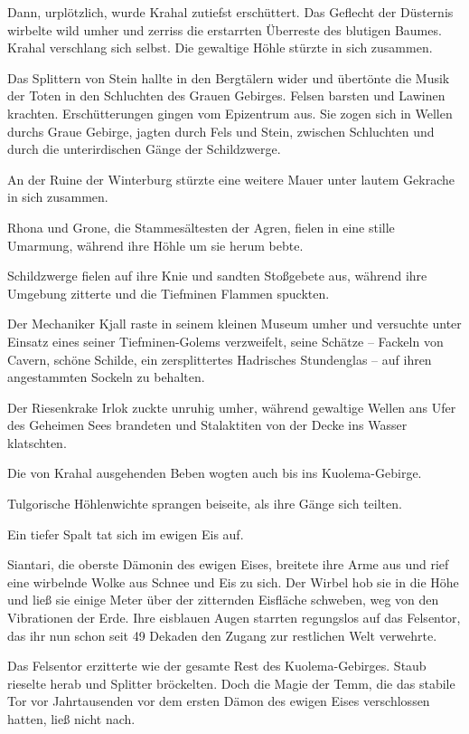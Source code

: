 Dann, urplötzlich, wurde Krahal zutiefst erschüttert. Das Geflecht der Düsternis wirbelte wild umher und zerriss die erstarrten Überreste des blutigen Baumes. Krahal verschlang sich selbst. Die gewaltige Höhle stürzte in sich zusammen.

Das Splittern von Stein hallte in den Bergtälern wider und übertönte die Musik der Toten in den Schluchten des Grauen Gebirges. Felsen barsten und Lawinen krachten. Erschütterungen gingen vom Epizentrum aus. Sie zogen sich in Wellen durchs Graue Gebirge, jagten durch Fels und Stein, zwischen Schluchten und durch die unterirdischen Gänge der Schildzwerge.

An der Ruine der Winterburg stürzte eine weitere Mauer unter lautem Gekrache in sich zusammen.

Rhona und Grone, die Stammesältesten der Agren, fielen in eine stille Umarmung, während ihre Höhle um sie herum bebte.

Schildzwerge fielen auf ihre Knie und sandten Stoßgebete aus, während ihre Umgebung zitterte und die Tiefminen Flammen spuckten.

Der Mechaniker Kjall raste in seinem kleinen Museum umher und versuchte unter Einsatz eines seiner Tiefminen-Golems verzweifelt, seine Schätze – Fackeln von Cavern, schöne Schilde, ein zersplittertes Hadrisches Stundenglas – auf ihren angestammten Sockeln zu behalten.

Der Riesenkrake Irlok zuckte unruhig umher, während gewaltige Wellen ans Ufer des Geheimen Sees brandeten und Stalaktiten von der Decke ins Wasser klatschten.

Die von Krahal ausgehenden Beben wogten auch bis ins Kuolema-Gebirge.

Tulgorische Höhlenwichte sprangen beiseite, als ihre Gänge sich teilten.

Ein tiefer Spalt tat sich im ewigen Eis auf.

Siantari, die oberste Dämonin des ewigen Eises, breitete ihre Arme aus und rief eine wirbelnde Wolke aus Schnee und Eis zu sich. Der Wirbel hob sie in die Höhe und ließ sie einige Meter über der zitternden Eisfläche schweben, weg von den Vibrationen der Erde. Ihre eisblauen Augen starrten regungslos auf das Felsentor, das ihr nun schon seit 49 Dekaden den Zugang zur restlichen Welt verwehrte.

Das Felsentor erzitterte wie der gesamte Rest des Kuolema-Gebirges. Staub rieselte herab und Splitter bröckelten. Doch die Magie der Temm, die das stabile Tor vor Jahrtausenden vor dem ersten Dämon des ewigen Eises verschlossen hatten, ließ nicht nach.

